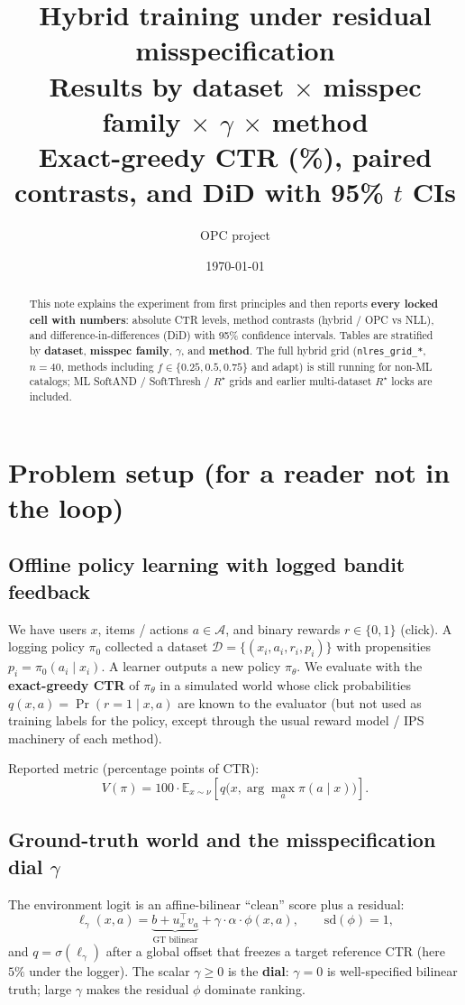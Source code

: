 \documentclass[10pt,a4paper]{article}
\title{\textbf{Hybrid training under residual misspecification}\\
\large Results by dataset $\times$ misspec family $\times$ $\gamma$ $\times$ method\\
\normalsize Exact-greedy CTR (\%), paired contrasts, and DiD with 95\% $t$ CIs}
\author{OPC project}
\date{\today}
\begin{document}
\maketitle
\begin{abstract}
\noindent
This note explains the experiment from first principles and then reports
\textbf{every locked cell with numbers}: absolute CTR levels, method contrasts
(hybrid / OPC vs NLL), and difference-in-differences (DiD) with 95\% confidence
intervals. Tables are stratified by \textbf{dataset}, \textbf{misspec family},
\textbf{$\gamma$}, and \textbf{method}. The full hybrid grid
(\texttt{nlres\_grid\_*}, $n{=}40$, methods including $f\in\{0.25,0.5,0.75\}$ and
adapt) is still running for non-ML catalogs; ML SoftAND / SoftThresh / $R^\star$
grids and earlier multi-dataset $R^\star$ locks are included.
\end{abstract}
\tableofcontents
\newpage


\section{Problem setup (for a reader not in the loop)}

\subsection{Offline policy learning with logged bandit feedback}
We have users $x$, items / actions $a\in\mathcal{A}$, and binary rewards
$r\in\{0,1\}$ (click). A logging policy $\pi_0$ collected a dataset
$\mathcal{D}=\{(x_i,a_i,r_i,p_i)\}$ with propensities $p_i=\pi_0(a_i\mid x_i)$.
A learner outputs a new policy $\pi_\theta$. We evaluate with the
\textbf{exact-greedy CTR} of $\pi_\theta$ in a simulated world whose click
probabilities $q(x,a)=\Pr(r{=}1\mid x,a)$ are known to the evaluator
(but not used as training labels for the policy, except through the usual
reward model / IPS machinery of each method).

Reported metric (percentage points of CTR):
\begin{equation}
V(\pi)=100\cdot\mathbb{E}_{x\sim\nu}\!\left[q\!\bigl(x,\arg\max_a \pi(a\mid x)\bigr)\right].
\end{equation}

\subsection{Ground-truth world and the misspecification dial $\gamma$}
The environment logit is an affine-bilinear ``clean'' score plus a residual:
\begin{equation}
\label{eq:logit}
\ell_\gamma(x,a)=\underbrace{b+u_x^\top v_a}_{\text{GT bilinear}}
+\gamma\cdot\alpha\cdot\phi(x,a),\qquad
\mathrm{sd}(\phi)=1,
\end{equation}
and $q=\sigma(\ell_\gamma)$ after a global offset that freezes a target
reference CTR (here $5\%$ under the logger). The scalar $\gamma\ge 0$ is the
\textbf{dial}: $\gamma=0$ is well-specified bilinear truth; large $\gamma$ makes
the residual $\phi$ dominate ranking.
\end{document}
